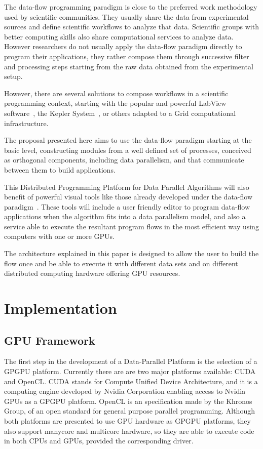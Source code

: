 \documentclass[conference]{IEEEtran}
\begin{document}
The data-flow programming paradigm is close to the preferred work methodology
used by scientific communities.  They usually share the data from experimental
sources and define scientific workflows to analyze that data.  Scientific groups
with better computing skills also share computational services to analyze data.
However researchers do not usually apply the data-flow paradigm directly to
program their applications, they rather compose them through successive filter
and processing steps starting from the raw data obtained from the experimental
setup.

However, there are several solutions to compose workflows in a scientific
programming context, starting with the popular and powerful LabView
software~\cite{LabView}, the Kepler System~\cite{Ludäscher05scientificworkflow},
or others adapted to a Grid computational infrastructure\cite{citeulike:798241}.

The proposal presented here aims to use the data-flow paradigm starting at the
basic level, constructing modules from a well defined set of processes,
conceived as orthogonal components, including data parallelism, and that
communicate between them to build applications.

This Distributed Programming Platform for Data Parallel Algorithms will also
benefit of powerful visual tools like those already developed under the
data-flow paradigm~\cite{Johnston:2004:ADP:1013208.1013209}.  These tools will
include a user friendly editor to program data-flow applications when the
algorithm fits into a data parallelism model, and also a service able to execute
the resultant program flows in the most efficient way using computers with one
or more GPUs.

The architecture explained in this paper is designed to allow the user to build
the flow once and be able to execute it with different data sets and on
different distributed computing hardware offering GPU resources.

\section{Implementation}

\subsection{GPU Framework}

The first step in the development of a Data-Parallel Platform is the selection
of a GPGPU platform.  Currently there are are two major platforms available:
CUDA and OpenCL\cite{gpgpu.org}.  CUDA stands for Compute Unified Device
Architecture, and it is a computing engine developed by Nvidia Corporation
enabling access to Nvidia GPUs as a GPGPU platform\cite{cuda2.0}.  OpenCL is an
specification made by the Khronos Group, of an open standard for general purpose
parallel programming\cite{opencl1.0}.  Although both platforms are presented to
use GPU hardware as GPGPU platforms, they also support manycore and multicore
hardware, so they are able to execute code in both CPUs and GPUs, provided the
corresponding driver.
\end{document}
